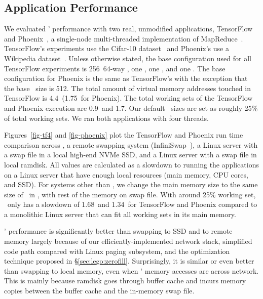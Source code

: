 \subsection{Application Performance}
\label{sec:appresults}
We evaluated \lego' performance with two real, unmodified applications, 
TensorFlow~\cite{TensorFlow} and Phoenix~\cite{Ranger07-HPCA}, a single-node multi-threaded implementation of MapReduce~\cite{DeanEtAl04-MapReduce}.
TensorFlow's experiments use the Cifar-10 dataset~\cite{CIFAR-DS} and Phoenix's use a Wikipedia dataset~\cite{Wiki-DS}.
Unless otherwise stated, the base configuration used for all TensorFlow experiments
is 256\MB\ 64-way \excache, one \pcomponent, one \mcomponent, and one \scomponent.
The base configuration for Phoenix is the same as TensorFlow's with the exception that the base \excache\ size is 512\MB.
The total amount of virtual memory addresses touched in TensorFlow is 4.4\GB\ (1.75\GB\ for Phoenix).
The total working sets of the TensorFlow and Phoenix execution are 0.9\GB\ and 1.7\GB.
Our default \excache\ sizes are set as roughly 25\% of total working sets.
We ran both applications with four threads.

Figures~\ref{fig-tf4} and \ref{fig-phoenix} plot the TensorFlow and Phoenix run time comparison across 
\lego, a remote swapping system (InfiniSwap~\cite{GU17-NSDI}), 
a Linux server with a swap file in a local high-end NVMe SSD, 
and a Linux server with a swap file in local ramdisk.
All values are calculated as a slowdown to running the applications on a Linux server that have enough local resources (main memory, CPU cores, and SSD).
For systems other than \lego, we change the main memory size to the same size of \excache\ in \lego, with rest of the memory on swap file. 
With around 25\% working set, \lego\ only has a slowdown of 1.68\x\ and 1.34\x\ for TensorFlow and Phoenix
compared to a monolithic Linux server that can fit all working sets in its main memory.

\lego' performance is significantly better than swapping to SSD and to remote memory 
largely because of our efficiently-implemented network stack, simplified code path compared with Linux paging subsystem,
and the optimization technique proposed in \S\ref{sec:lego:zerofill}.
Surprisingly, it is similar or even better than swapping to local memory, even when \lego' memory accesses are across network.
This is mainly because ramdisk goes through buffer cache and incurs memory copies between the buffer cache and the in-memory swap file.

